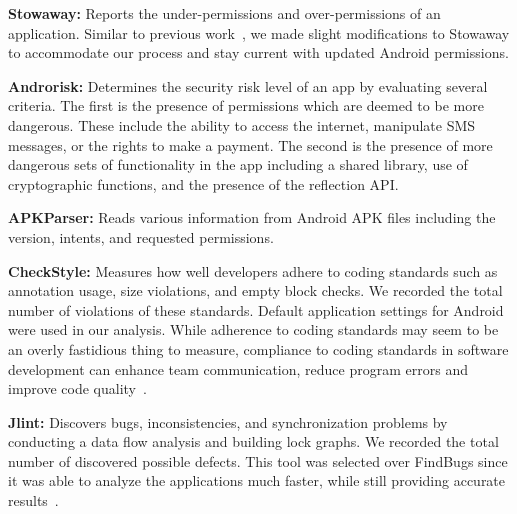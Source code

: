 \documentclass{sig-alternate-05-2015}
\begin{document}

\textbf{Stowaway:} Reports the under-permissions and over-permissions of an application. Similar to previous work~\cite{6624000}, we made slight modifications to Stowaway to accommodate our process and stay current with updated Android permissions.

\textbf{Androrisk:} Determines the security risk level of an app by evaluating several criteria. The first is the presence of permissions which are deemed to be more dangerous. These include the ability to access the internet, manipulate SMS messages, or the rights to make a payment. The second is the presence of more dangerous sets of functionality in the app including a shared library, use of cryptographic functions, and the presence of the reflection API.

\textbf{APKParser:} Reads various information from Android APK files including the version, intents, and requested permissions.

\textbf{CheckStyle:} Measures how well developers adhere to coding standards such as annotation usage, size violations, and empty block checks. We recorded the total number of violations of these standards. Default application settings for Android were used in our analysis. While adherence to coding standards may seem to be an overly fastidious thing to measure, compliance to coding standards in software development can enhance team communication, reduce program errors and improve code quality~\cite{Li:2005:ETC:1095714.1095770, li2006using}.

\textbf{Jlint:} Discovers bugs, inconsistencies, and synchronization problems by conducting a data flow analysis and building lock graphs. We recorded the total number of discovered possible defects. This tool was selected over FindBugs since it was able to analyze the applications much faster, while still providing accurate results~\cite{rutar2004comparison}.


\end{document}
